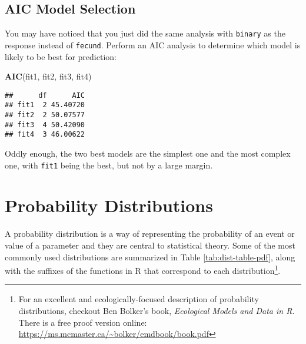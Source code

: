 \documentclass[]{book}
\newenvironment{Shaded}{\begin{snugshade}}{\end{snugshade}}
\newcommand{\KeywordTok}[1]{\textcolor[rgb]{0.13,0.29,0.53}{\textbf{#1}}}
\newcommand{\NormalTok}[1]{#1}
\let\rmarkdownfootnote\footnote%
\def\footnote{\protect\rmarkdownfootnote}
\theoremstyle{definition}
\theoremstyle{definition}
\theoremstyle{definition}
\theoremstyle{remark}
\begin{document}
\subsection{AIC Model Selection}\label{aic-model-selection-1}

You may have noticed that you just did the same analysis with
\texttt{binary} as the response instead of \texttt{fecund}. Perform an
AIC analysis to determine which model is likely to be best for
prediction:

\begin{Shaded}
\begin{Highlighting}[]
\KeywordTok{AIC}\NormalTok{(fit1, fit2, fit3, fit4)}
\end{Highlighting}
\end{Shaded}

\begin{verbatim}
##      df      AIC
## fit1  2 45.40720
## fit2  2 50.07577
## fit3  4 50.42090
## fit4  3 46.00622
\end{verbatim}

Oddly enough, the two best models are the simplest one and the most
complex one, with \texttt{fit1} being the best, but not by a large
margin.

\section{Probability Distributions}\label{dists}

A probability distribution is a way of representing the probability of
an event or value of a parameter and they are central to statistical
theory. Some of the most commonly used distributions are summarized in
Table \ref{tab:dist-table-pdf}, along with the suffixes of the functions
in R that correspond to each distribution\footnote{For an excellent and
  ecologically-focused description of probability distributions,
  checkout Ben Bolker's book, \emph{Ecological Models and Data in R}.
  There is a free proof version online:
  \url{https://ms.mcmaster.ca/~bolker/emdbook/book.pdf}}.
\end{document}
